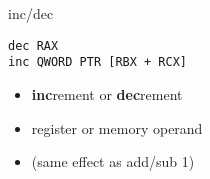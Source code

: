 \begin{frame}[fragile,label=incDec]{inc/dec}
\begin{lstlisting}
dec RAX
inc QWORD PTR [RBX + RCX]
\end{lstlisting}
\begin{itemize}
\item \textbf{inc}rement or \textbf{dec}rement
\item register or memory operand
\vspace{.5cm}
\item (same effect as add/sub 1)
\end{itemize}
\end{frame}
